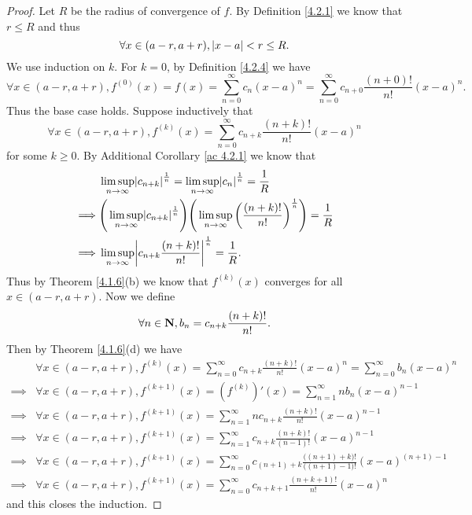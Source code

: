 \begin{proof}
    Let \(R\) be the radius of convergence of \(f\).
    By Definition \ref{4.2.1} we know that \(r \leq R\) and thus
    \[
        \forall x \in (a - r, a + r), \left\lvert x - a\right\rvert < r \leq R.
    \]
    We use induction on \(k\).
    For \(k = 0\), by Definition \ref{4.2.4} we have
    \[
        \forall x \in (a - r, a + r), f^{(0)}(x) = f(x) = \sum_{n = 0}^\infty c_n (x - a)^n = \sum_{n = 0}^\infty c_{n + 0} \frac{(n + 0)!}{n!} (x - a)^n.
    \]
    Thus the base case holds.
    Suppose inductively that
    \[
        \forall x \in (a - r, a + r), f^{(k)}(x) = \sum_{n = 0}^\infty c_{n + k} \frac{(n + k)!}{n!} (x - a)^n
    \]
    for some \(k \geq 0\).
    By Additional Corollary \ref{ac 4.2.1} we know that
    \begin{align*}
                 & \limsup_{n \to \infty} \abs{c_{n + k}}^{\frac{1}{n}} = \limsup_{n \to \infty} \abs{c_n}^{\frac{1}{n}} = \frac{1}{R}                                             \\
        \implies & \Bigg(\limsup_{n \to \infty} \abs{c_{n + k}}^{\frac{1}{n}}\Bigg) \Bigg(\limsup_{n \to \infty} \bigg(\frac{(n + k)!}{n!}\bigg)^{\frac{1}{n}}\Bigg) = \frac{1}{R} \\
        \implies & \limsup_{n \to \infty} \abs{c_{n + k} \frac{(n + k)!}{n!}}^{\frac{1}{n}} = \frac{1}{R}.
    \end{align*}
    Thus by Theorem \ref{4.1.6}(b) we know that \(f^{(k)}(x)\) converges for all \(x \in (a - r, a + r)\).
    Now we define
    \[
        \forall n \in \mathbf{N}, b_n = c_{n + k} \frac{(n + k)!}{n!}.
    \]
    Then by Theorem \ref{4.1.6}(d) we have
    \begin{align*}
                 & \forall x \in (a - r, a + r), f^{(k)}(x) = \sum_{n = 0}^\infty c_{n + k} \frac{(n + k)!}{n!} (x - a)^n = \sum_{n = 0}^\infty b_n (x - a)^n                     \\
        \implies & \forall x \in (a - r, a + r), f^{(k + 1)}(x) = (f^{(k)})'(x) = \sum_{n = 1}^\infty n b_n (x - a)^{n - 1}                                                       \\
        \implies & \forall x \in (a - r, a + r), f^{(k + 1)}(x) = \sum_{n = 1}^\infty n c_{n + k} \frac{(n + k)!}{n!} (x - a)^{n - 1}                                             \\
        \implies & \forall x \in (a - r, a + r), f^{(k + 1)}(x) = \sum_{n = 1}^\infty c_{n + k} \frac{(n + k)!}{(n - 1)!} (x - a)^{n - 1}                                         \\
        \implies & \forall x \in (a - r, a + r), f^{(k + 1)}(x) = \sum_{n = 0}^\infty c_{(n + 1) + k} \frac{\big((n + 1) + k\big)!}{\big((n + 1) - 1\big)!} (x - a)^{(n + 1) - 1} \\
        \implies & \forall x \in (a - r, a + r), f^{(k + 1)}(x) = \sum_{n = 0}^\infty c_{n + k + 1} \frac{(n + k + 1)!}{n!} (x - a)^n
    \end{align*}
    and this closes the induction.
\end{proof}

